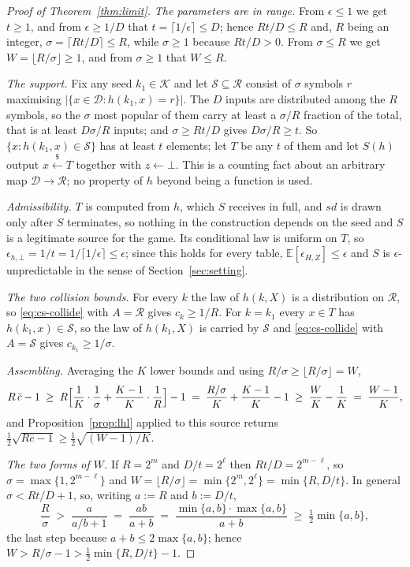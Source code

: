 \documentclass{aicr-solution}
\newcommand{\sd}{\mathit{sd}}
\renewcommand{\sample}{\stackrel{{\scriptscriptstyle\$}}{\leftarrow}}
\newcommand{\calK}{\mathcal{K}}
\newcommand{\calD}{\mathcal{D}}
\newcommand{\calR}{\mathcal{R}}
\newcommand{\calS}{\mathcal{S}}
\begin{document}
\begin{proof}[Proof of Theorem~\ref{thm:limit}]
\emph{The parameters are in range.} From $\epsilon \le 1$ we get $t \ge 1$, and from
$\epsilon \ge 1/D$ that $t = \lceil 1/\epsilon\rceil \le D$; hence $Rt/D \le R$ and, $R$ being an
integer, $\sigma = \lceil Rt/D\rceil \le R$, while $\sigma \ge 1$ because $Rt/D > 0$. From
$\sigma \le R$ we get $W = \lfloor R/\sigma\rfloor \ge 1$, and from $\sigma \ge 1$ that $W \le R$.

\emph{The support.} Fix any seed $k_1 \in \calK$ and let $\calS \subseteq \calR$ consist of
$\sigma$ symbols $r$ maximising $|\{x \in \calD : h(k_1,x) = r\}|$. The $D$ inputs are distributed
among the $R$ symbols, so the $\sigma$ most popular of them carry at least a $\sigma/R$ fraction of
the total, that is at least $D\sigma/R$ inputs; and $\sigma \ge Rt/D$ gives $D\sigma/R \ge t$. So
$\{x : h(k_1,x) \in \calS\}$ has at least $t$ elements; let $T$ be any $t$ of them and let $S(h)$
output $x \sample T$ together with $z \leftarrow \bot$. This is a counting fact about an arbitrary
map $\calD \to \calR$; no property of $h$ beyond being a function is used.

\emph{Admissibility.} $T$ is computed from $h$, which $S$ receives in full, and $\sd$ is drawn only
after $S$ terminates, so nothing in the construction depends on the seed and $S$ is a legitimate
source for the game. Its conditional law is uniform on $T$, so
$\epsilon_{h,\bot} = 1/t = 1/\lceil 1/\epsilon\rceil \le \epsilon$; since this holds for every
table, $\mathbb{E}[\epsilon_{H,Z}] \le \epsilon$ and $S$ is $\epsilon$-unpredictable in the sense of
Section~\ref{sec:setting}.

\emph{The two collision bounds.} For every $k$ the law of $h(k,X)$ is a distribution on $\calR$, so
\eqref{eq:cs-collide} with $A = \calR$ gives $c_k \ge 1/R$. For $k = k_1$ every $x \in T$ has
$h(k_1,x) \in \calS$, so the law of $h(k_1,X)$ is carried by $\calS$ and \eqref{eq:cs-collide} with
$A = \calS$ gives $c_{k_1} \ge 1/\sigma$.

\emph{Assembling.} Averaging the $K$ lower bounds and using $R/\sigma \ge \lfloor R/\sigma\rfloor
= W$,
\[
  R\,\bar c - 1
  \;\ge\; R\Bigl[\frac1K\cdot\frac1\sigma + \frac{K-1}{K}\cdot\frac1R\Bigr] - 1
  \;=\; \frac{R/\sigma}{K} + \frac{K-1}{K} - 1
  \;\ge\; \frac{W}{K} - \frac1K
  \;=\; \frac{W-1}{K} ,
\]
and Proposition~\ref{prop:lhl} applied to this source returns
$\tfrac12\sqrt{R\bar c - 1} \ge \tfrac12\sqrt{(W-1)/K}$.

\emph{The two forms of $W$.} If $R = 2^{m}$ and $D/t = 2^{\ell}$ then $Rt/D = 2^{m-\ell}$, so
$\sigma = \max\{1, 2^{m-\ell}\}$ and $W = \lfloor R/\sigma\rfloor = \min\{2^{m}, 2^{\ell}\}
= \min\{R, D/t\}$. In general $\sigma < Rt/D + 1$, so, writing $a := R$ and $b := D/t$,
\[
  \frac{R}{\sigma} \;>\; \frac{a}{a/b + 1} \;=\; \frac{ab}{a+b}
  \;=\; \frac{\min\{a,b\}\cdot\max\{a,b\}}{a+b}
  \;\ge\; \tfrac12\min\{a,b\} ,
\]
the last step because $a + b \le 2\max\{a,b\}$; hence
$W > R/\sigma - 1 > \tfrac12\min\{R, D/t\} - 1$.
\end{proof}
\end{document}
